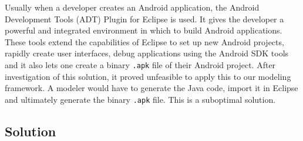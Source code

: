 Usually when a developer creates an Android application, the Android Development Tools (ADT) 
Plugin for Eclipse is used. It gives the developer a powerful and integrated environment in which to build Android applications. These tools extend the capabilities of Eclipse to set up new Android projects, rapidly create user interfaces, debug applications using the Android SDK tools and it also lets one create a binary \texttt{.apk} file of their Android project. After investigation of this solution, it proved unfeasible to apply this to our modeling framework. A modeler would have to generate the Java code, import it in Eclipse and ultimately generate the binary \texttt{.apk} file. This is a suboptimal solution.

\subsection{Solution}

